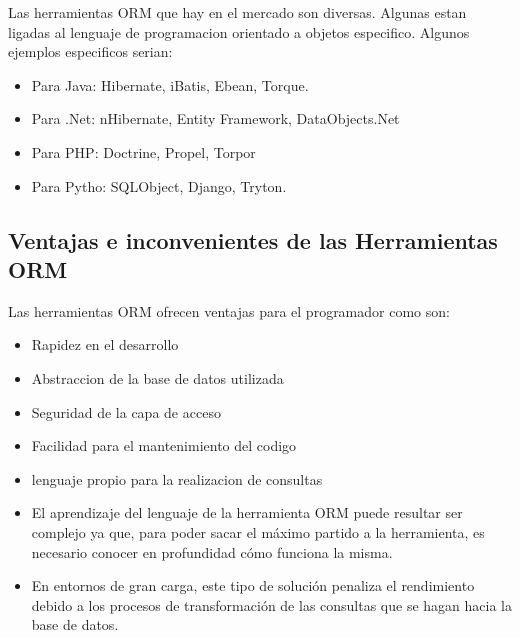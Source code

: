 \documentclass[twoside,twocolumn]{article}
\begin{document}
Las herramientas ORM que hay en el mercado son diversas. Algunas estan ligadas al lenguaje de programacion orientado a objetos especifico.
Algunos ejemplos especificos serian: 

\begin{itemize}
\item Para Java: Hibernate, iBatis, Ebean, Torque.
\item Para .Net: nHibernate, Entity Framework, DataObjects.Net
\item Para PHP: Doctrine, Propel, Torpor
\item Para Pytho: SQLObject, Django, Tryton.


\end{itemize}

\subsection{Ventajas e inconvenientes de las Herramientas ORM}

Las herramientas ORM ofrecen ventajas para el programador como son:
 \begin{itemize}
	 \item Rapidez en el desarrollo
	 \item Abstraccion de la base de datos utilizada
	 \item Seguridad de la capa de acceso
	 \item Facilidad para el mantenimiento del codigo
	 \item lenguaje propio para la realizacion de consultas
	\item El aprendizaje del lenguaje de la herramienta ORM puede resultar ser complejo ya que, para poder sacar el máximo partido            a la herramienta, es necesario conocer en profundidad cómo funciona la misma.
          \item En entornos de gran carga, este tipo de solución penaliza el rendimiento debido a los procesos de transformación de las  consultas que se hagan hacia la base de datos.
 \end{itemize}
\end{document}
